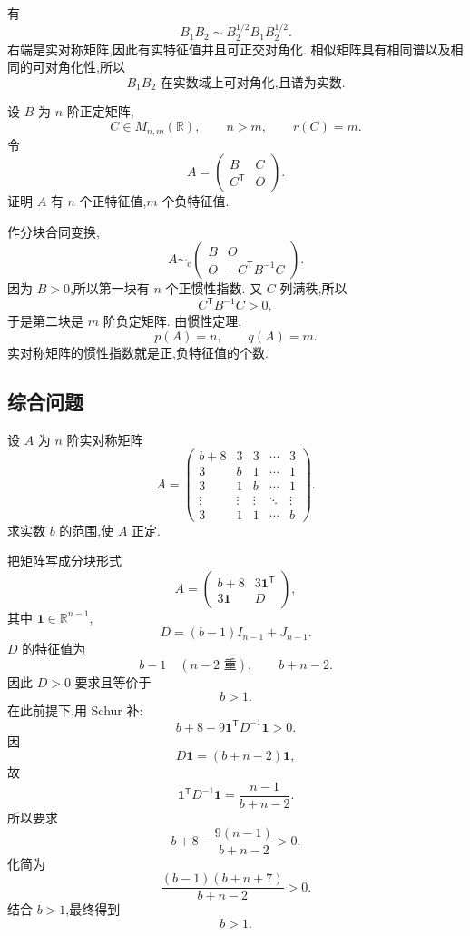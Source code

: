 \begin{solution}
有
\[
B_1B_2
\sim
B_2^{1/2}B_1B_2^{1/2}.
\]
右端是实对称矩阵,因此有实特征值并且可正交对角化.
相似矩阵具有相同谱以及相同的可对角化性,所以
\[
\boxed{B_1B_2\text{ 在实数域上可对角化,且谱为实数}.}
\]
\end{solution}


\begin{example}
设 $B$ 为 $n$ 阶正定矩阵,
\[
C\in M_{n,m}(\mathbb{R}),
\qquad
n>m,\qquad r(C)=m.
\]
令
\[
A=
\begin{pmatrix}
B&C\\
C^{\mathsf T}&O
\end{pmatrix}.
\]
证明 $A$ 有 $n$ 个正特征值,$m$ 个负特征值.
\end{example}
\exampleblank

\begin{solution}
作分块合同变换,
\[
A
\sim_{\mathrm c}
\begin{pmatrix}
B&O\\
O&-C^{\mathsf T}B^{-1}C
\end{pmatrix}.
\]
因为 $B>0$,所以第一块有 $n$ 个正惯性指数.
又 $C$ 列满秩,所以
\[
C^{\mathsf T}B^{-1}C>0,
\]
于是第二块是 $m$ 阶负定矩阵.
由惯性定理,
\[
\boxed{p(A)=n,\qquad q(A)=m}.
\]
实对称矩阵的惯性指数就是正,负特征值的个数.
\end{solution}


\subsection{综合问题}

\begin{example}
设 $A$ 为 $n$ 阶实对称矩阵
\[
A=
\begin{pmatrix}
b+8&3&3&\cdots&3\\
3&b&1&\cdots&1\\
3&1&b&\cdots&1\\
\vdots&\vdots&\vdots&\ddots&\vdots\\
3&1&1&\cdots&b
\end{pmatrix}.
\]
求实数 $b$ 的范围,使 $A$ 正定.
\end{example}
\exampleblank

\begin{solution}
把矩阵写成分块形式
\[
A=
\begin{pmatrix}
b+8&3\boldsymbol{1}^{\mathsf T}\\
3\boldsymbol{1}&D
\end{pmatrix},
\]
其中 $\boldsymbol{1}\in\mathbb{R}^{n-1}$,
\[
D=(b-1)I_{n-1}+J_{n-1}.
\]
$D$ 的特征值为
\[
b-1\quad(n-2\text{ 重}),
\qquad
b+n-2.
\]
因此 $D>0$ 要求且等价于
\[
b>1.
\]
在此前提下,用 Schur 补:
\[
b+8
-
9\boldsymbol{1}^{\mathsf T}D^{-1}\boldsymbol{1}
>0.
\]
因
\[
D\boldsymbol{1}=(b+n-2)\boldsymbol{1},
\]
故
\[
\boldsymbol{1}^{\mathsf T}D^{-1}\boldsymbol{1}
=
\dfrac{n-1}{b+n-2}.
\]
所以要求
\[
b+8-\dfrac{9(n-1)}{b+n-2}>0.
\]
化简为
\[
\dfrac{(b-1)(b+n+7)}{b+n-2}>0.
\]
结合 $b>1$,最终得到
\[
\boxed{b>1}.
\]
\end{solution}


